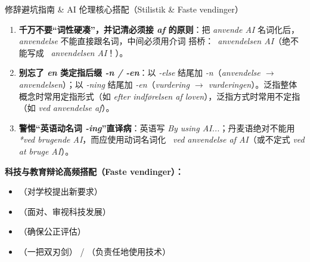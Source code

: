 \begin{grammatikbox}{修辞避坑指南 \& AI 伦理核心搭配（Stilistik \& Faste vendinger）}
\begin{enumerate}
  \item \textbf{千万不要“词性硬凑”，并记清必须接 \textit{af} 的原则}：把 \textit{anvende AI} 名词化后，\textit{anvendelse} 不能直接跟名词，中间必须用介词  搭桥：\ \textit{anvendelsen  AI}（绝不能写成 \ \textit{anvendelsen AI}！）。
  \item \textbf{别忘了 \textit{en} 类定指后缀 \textit{-n / -en}}：以 \textit{-else} 结尾加 \textit{-n}（\textit{anvendelse $\rightarrow$ anvendelsen}）；以 \textit{-ning} 结尾加 \textit{-en}（\textit{vurdering $\rightarrow$ vurderingen}）。泛指整体概念时常用定指形式（如 \textit{efter indførelsen af loven}），泛指方式时常用不定指（如 \textit{ved anvendelse af}）。
  \item \textbf{警惕“英语动名词 \textit{-ing}”直译病}：英语写 \textit{By using AI...}；丹麦语绝对不能用 \textit{*ved brugende AI}，而应使用动词名词化 \ \textit{ved anvendelse af AI}（或不定式 \textit{ved at bruge AI}）。
\end{enumerate}

\textbf{科技与教育辩论高频搭配（Faste vendinger）：}
\begin{itemize}
  \item {}（对学校提出新要求）
  \item {}（面对、审视科技发展）
  \item {}（确保公正评估）
  \item {}（一把双刃剑） / （负责任地使用技术）
\end{itemize}
\end{grammatikbox}


